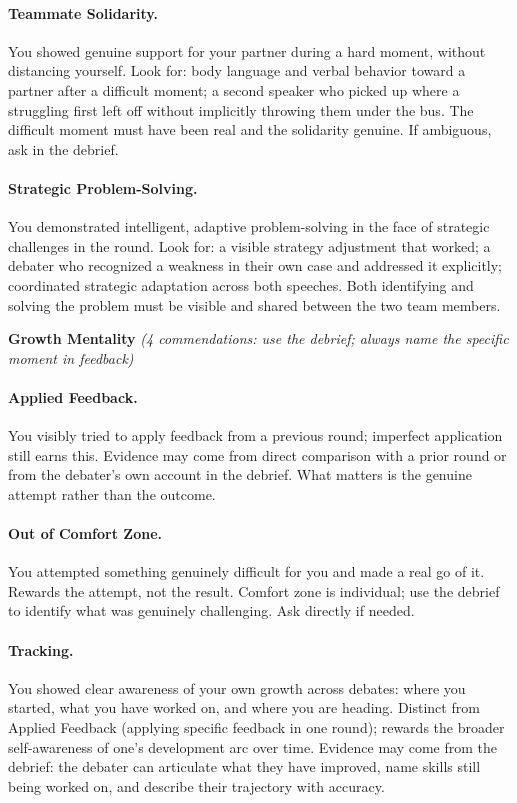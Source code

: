 \paragraph{Teammate Solidarity.} You showed genuine support for your partner during a hard moment, without distancing yourself. Look for: body language and verbal behavior toward a partner after a difficult moment; a second speaker who picked up where a struggling first left off without implicitly throwing them under the bus. The difficult moment must have been real and the solidarity genuine. If ambiguous, ask in the debrief.

\paragraph{Strategic Problem-Solving.} You demonstrated intelligent, adaptive problem-solving in the face of strategic challenges in the round. Look for: a visible strategy adjustment that worked; a debater who recognized a weakness in their own case and addressed it explicitly; coordinated strategic adaptation across both speeches. Both identifying and solving the problem must be visible and shared between the two team members.

\medskip
\noindent\textbf{Growth Mentality} \textit{(4 commendations: use the debrief; always name the specific moment in feedback)}

\paragraph{Applied Feedback.} You visibly tried to apply feedback from a previous round; imperfect application still earns this. Evidence may come from direct comparison with a prior round or from the debater's own account in the debrief. What matters is the genuine attempt rather than the outcome.

\paragraph{Out of Comfort Zone.} You attempted something genuinely difficult for you and made a real go of it. Rewards the attempt, not the result. Comfort zone is individual; use the debrief to identify what was genuinely challenging. Ask directly if needed.

\paragraph{Tracking.} You showed clear awareness of your own growth across debates: where you started, what you have worked on, and where you are heading. Distinct from Applied Feedback (applying specific feedback in one round); rewards the broader self-awareness of one's development arc over time. Evidence may come from the debrief: the debater can articulate what they have improved, name skills still being worked on, and describe their trajectory with accuracy.

